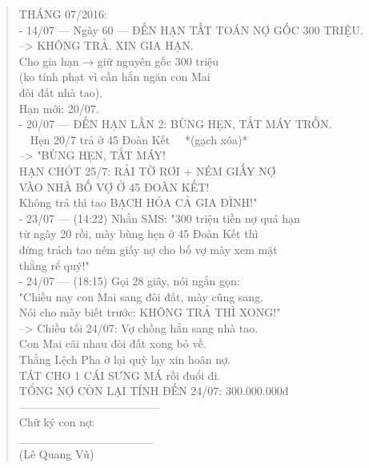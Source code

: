 \documentclass[12pt,a4paper]{article}
\begin{document}
\begin{quote}
THÁNG 07/2016:\\
- 14/07 --- Ngày 60 --- ĐẾN HẠN TẤT TOÁN NỢ GỐC 300 TRIỆU.\\
          --> KHÔNG TRẢ. XIN GIA HẠN.\\
              Cho gia hạn → giữ nguyên gốc 300 triệu\\
              (ko tính phạt vì cần hắn ngăn con Mai\\
              đòi đất nhà tao).\\
              Hạn mới: 20/07.\\
- 20/07 --- ĐẾN HẠN LẦN 2: BÙNG HẸN, TẮT MÁY TRỐN.\\
          ~~Hẹn 20/7 trả ở 45 Đoàn Kết~~ *(gạch xóa)*\\
          --> "BÙNG HẸN, TẮT MÁY!\\
               HẠN CHÓT 25/7: RẢI TỜ RƠI + NÉM GIẤY NỢ\\
               VÀO NHÀ BỐ VỢ Ở 45 ĐOÀN KẾT!\\
               Không trả thì tao BẠCH HÓA CẢ GIA ĐÌNH!"\\
- 23/07 --- (14:22) Nhắn SMS: "300 triệu tiền nợ quá hạn\\
          từ ngày 20 rồi, mày bùng hẹn ở 45 Đoàn Kết thì\\
          đừng trách tao ném giấy nợ cho bố vợ mày xem mặt\\
          thằng rể quý!"\\
- 24/07 --- (18:15) Gọi 28 giây, nói ngắn gọn:\\
          "Chiều nay con Mai sang đòi đất, mày cũng sang.\\
           Nói cho mày biết trước: KHÔNG TRẢ THÌ XONG!"\\
          --> Chiều tối 24/07: Vợ chồng hắn sang nhà tao.\\
              Con Mai cãi nhau đòi đất xong bỏ về.\\
              Thằng Lệch Pha ở lại quỳ lạy xin hoãn nợ.\\
              TÁT CHO 1 CÁI SƯNG MÁ rồi đuổi đi.\\
\vspace{0.2cm}
TỔNG NỢ CÒN LẠI TÍNH ĐẾN 24/07: 300.000.000đ \\
--------------------------------------\\
Chữ ký con nợ:\\
\vspace{0.2cm}
\_\_\_\_\_\_\_\_\_\_\_\_\_\_\_\_\\
(Lê Quang Vũ)\\
\end{quote}
\end{document}

